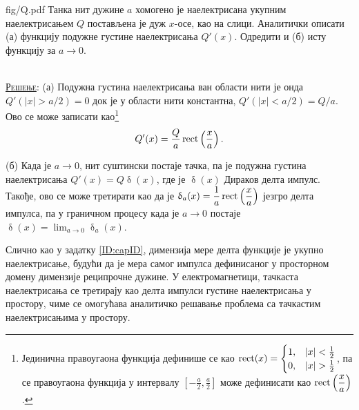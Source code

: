 \noindent
\begin{slikaDesno}[0.833]{fig/Q.pdf}\noindent
\PID 
Танка нит дужине $a$ хомогено је наелектрисана укупним 
наелектрисањем $Q$ постављена је дуж $x$-осе, као на слици. 
Аналитички описати (а) функцију подужне густине 
наелектрисања $Q'(x)$. Одредити и (б) исту функцију за
$a \to 0$. 
\end{slikaDesno} \\[2mm]

\textsc{\underline{Решење}}:
(а) Подужна густина наелектрисања ван области нити је онда 
    $Q'(|x| > a/2) = 0$ док је у области нити константна, $Q'(|x| < a/2) = Q/a$.
    Ово се може записати као\footnote{ Јединична правоугаона функција дефинише се као \vspace*{1mm}
    $\operatorname{rect}(x) = \begin{cases}
        1, & |x| < \frac12 \\
        0, & |x| > \frac12 \end{cases}$, 
        па се правоугаона функција у интервалу $\displaystyle \left[-\frac{a}{2}, \frac{a}{2}\right]$ може дефинисати као
        $\operatorname{rect}\left(\dfrac{x}{a}\right)$.}
    \begin{equation}
        Q'(x) = \dfrac{Q}{a} \operatorname{rect}\left(\dfrac{x}{a}\right).
    \end{equation}
    
(б) Када је $a \to 0$, нит суштински постаје тачка, па је подужна густина наелектрисања
    $Q'(x) = Q \updelta(x)$, где је $\updelta(x)$ Дираков делта импулс. Такође, ово се може третирати као да је 
    $\updelta_a(x) = \dfrac{1}{a} \operatorname{rect}\left(\dfrac{x}{a}\right)$ језгро делта импулса, па у граничном процесу 
    \vspace*{1mm}
    када је $a \to 0$ постаје $\updelta(x) = \lim_{a \to 0} \updelta_a(x)$.

Слично као у задатку \ref{ID:capID}, димензија мере делта функције је укупно наелектрисање, будући да је мера
самог импулса дефинисаног у просторном домену димензије реципрочне дужине. 
У електромагнетици, тачкаста наелектрисања се третирају као делта импулси густине наелектрисања у простору, чиме се 
    омогућава аналитичко решавање проблема са тачкастим наелектрисањима у простору.